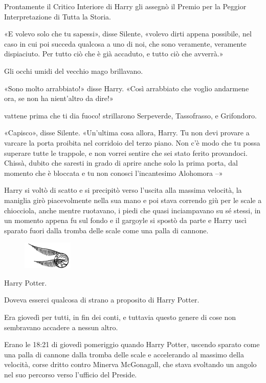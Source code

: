 Prontamente il Critico Interiore di Harry gli assegnò il Premio per la Peggior Interpretazione di Tutta la Storia.

«E volevo solo che tu sapessi», disse Silente, «volevo dirti appena possibile, nel caso in cui poi succeda qualcosa a uno di noi, che sono veramente, veramente dispiaciuto. Per tutto ciò che è già accaduto, e tutto ciò che avverrà.»

Gli occhi umidi del vecchio mago brillavano.

«Sono molto arrabbiato!» disse Harry. «Così arrabbiato che voglio andarmene ora, se non ha nient’altro da dire!»

vattene prima che ti dia fuoco! strillarono Serpeverde, Tassofrasso, e Grifondoro.

«Capisco», disse Silente. «Un’ultima cosa allora, Harry. Tu non devi provare a varcare la porta proibita nel corridoio del terzo piano. Non c’è modo che tu possa superare tutte le trappole, e non vorrei sentire che sei stato ferito provandoci. Chissà, dubito che saresti in grado di aprire anche solo la prima porta, dal momento che è bloccata e tu non conosci l’incantesimo Alohomora –»

Harry si voltò di scatto e si precipitò verso l’uscita alla massima velocità, la maniglia girò piacevolmente nella sua mano e poi stava correndo giù per le scale a chiocciola, anche mentre ruotavano, i piedi che quasi inciampavano su sé stessi, in un momento appena fu sul fondo e il gargoyle si spostò da parte e Harry uscì sparato fuori dalla tromba delle scale come una palla di cannone.

\begin{figure}[h!]
        \includegraphics[scale=0.4]{boccino.png}
        \centering
\end{figure}

Harry Potter.

Doveva esserci qualcosa di strano a proposito di Harry Potter.

Era giovedì per tutti, in fin dei conti, e tuttavia questo genere di cose non sembravano accadere a nessun altro.

Erano le 18:21 di giovedì pomeriggio quando Harry Potter, uscendo sparato come una palla di cannone dalla tromba delle scale e accelerando al massimo della velocità, corse dritto contro Minerva McGonagall, che stava svoltando un angolo nel suo percorso verso l’ufficio del Preside.

